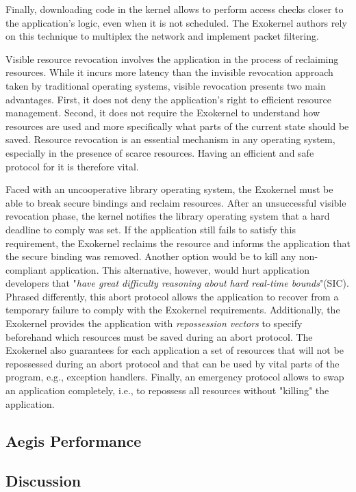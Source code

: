 Finally, downloading code in the kernel allows to perform access checks closer to the application's logic, even when it is not scheduled.
The Exokernel authors rely on this technique to multiplex the network and implement packet filtering.

Visible resource revocation involves the application in the process of reclaiming resources.
While it incurs more latency than the invisible revocation approach taken by traditional operating systems, visible revocation presents two main advantages.
First, it does not deny the application's right to efficient resource management.
Second, it does not require the Exokernel to understand how resources are used and more specifically what parts of the current state should be saved.
Resource revocation is an essential mechanism in any operating system, especially in the presence of scarce resources.
Having an efficient and safe protocol for it is therefore vital.

Faced with an uncooperative library operating system, the Exokernel must be able to break secure bindings and reclaim resources.
After an unsuccessful visible revocation phase, the kernel notifies the library operating system that a hard deadline to comply was set.
If the application still fails to satisfy this requirement, the Exokernel reclaims the resource and informs the application that the secure binding was removed.
Another option would be to kill any non-compliant application.
This alternative, however, would hurt application developers that "\textit{have great difficulty reasoning about hard real-time bounds}"(SIC).
Phrased differently, this abort protocol allows the application to recover from a temporary failure to comply with the Exokernel requirements.
Additionally, the Exokernel provides the application with \emph{repossession vectors} to specify beforehand which resources must be saved during an abort protocol.
The Exokernel also guarantees for each application a set of resources that will not be repossessed during an abort protocol and that can be used by vital parts of the program, e.g., exception handlers.
Finally, an emergency protocol allows to swap an application completely, i.e., to repossess all resources without "killing" the application.












\subsection{Aegis Performance}

\subsection{Discussion}



